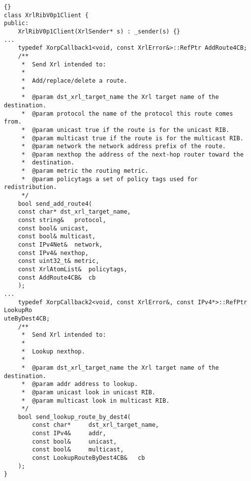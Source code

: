 \documentclass[11pt]{article}
\newcommand{\stt}{\tt\small}
\begin{document}
\begin{lstlisting}[caption={Extracts from {\stt xorp/xrl/interfaces/rib\_xif.hh} %
                                     \label{lst:ribxif.hh} } ]{}
class XrlRibV0p1Client {
public:
    XrlRibV0p1Client(XrlSender* s) : _sender(s) {}
...
    typedef XorpCallback1<void, const XrlError&>::RefPtr AddRoute4CB;
    /**
     *  Send Xrl intended to:
     *
     *  Add/replace/delete a route.
     *
     *  @param dst_xrl_target_name the Xrl target name of the destination.
     *  @param protocol the name of the protocol this route comes from.
     *  @param unicast true if the route is for the unicast RIB.
     *  @param multicast true if the route is for the multicast RIB.
     *  @param network the network address prefix of the route.
     *  @param nexthop the address of the next-hop router toward the
     *  destination.
     *  @param metric the routing metric.
     *  @param policytags a set of policy tags used for redistribution.
     */
    bool send_add_route4(
	const char*	dst_xrl_target_name,
	const string&	protocol,
	const bool&	unicast,
	const bool&	multicast,
	const IPv4Net&	network,
	const IPv4&	nexthop,
	const uint32_t&	metric,
	const XrlAtomList&	policytags,
	const AddRoute4CB&	cb
    );
...
    typedef XorpCallback2<void, const XrlError&, const IPv4*>::RefPtr LookupRo
uteByDest4CB;
    /**
     *  Send Xrl intended to:
     *
     *  Lookup nexthop.
     *
     *  @param dst_xrl_target_name the Xrl target name of the destination.
     *  @param addr address to lookup.
     *  @param unicast look in unicast RIB.
     *  @param multicast look in multicast RIB.
     */
    bool send_lookup_route_by_dest4(
        const char*     dst_xrl_target_name,
        const IPv4&     addr,
        const bool&     unicast,
        const bool&     multicast,
        const LookupRouteByDest4CB&   cb
    );
}
\end{lstlisting}
\newpage
\end{document}
